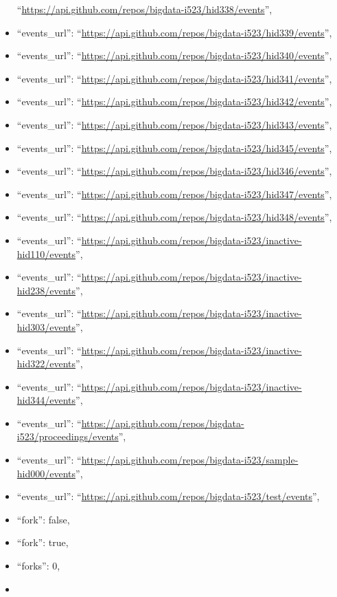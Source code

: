 \begin{itemize}
  ``\url{https://api.github.com/repos/bigdata-i523/hid338/events}'',
\item
  ``events\_url'':
  ``\url{https://api.github.com/repos/bigdata-i523/hid339/events}'',
\item
  ``events\_url'':
  ``\url{https://api.github.com/repos/bigdata-i523/hid340/events}'',
\item
  ``events\_url'':
  ``\url{https://api.github.com/repos/bigdata-i523/hid341/events}'',
\item
  ``events\_url'':
  ``\url{https://api.github.com/repos/bigdata-i523/hid342/events}'',
\item
  ``events\_url'':
  ``\url{https://api.github.com/repos/bigdata-i523/hid343/events}'',
\item
  ``events\_url'':
  ``\url{https://api.github.com/repos/bigdata-i523/hid345/events}'',
\item
  ``events\_url'':
  ``\url{https://api.github.com/repos/bigdata-i523/hid346/events}'',
\item
  ``events\_url'':
  ``\url{https://api.github.com/repos/bigdata-i523/hid347/events}'',
\item
  ``events\_url'':
  ``\url{https://api.github.com/repos/bigdata-i523/hid348/events}'',
\item
  ``events\_url'':
  ``\url{https://api.github.com/repos/bigdata-i523/inactive-hid110/events}'',
\item
  ``events\_url'':
  ``\url{https://api.github.com/repos/bigdata-i523/inactive-hid238/events}'',
\item
  ``events\_url'':
  ``\url{https://api.github.com/repos/bigdata-i523/inactive-hid303/events}'',
\item
  ``events\_url'':
  ``\url{https://api.github.com/repos/bigdata-i523/inactive-hid322/events}'',
\item
  ``events\_url'':
  ``\url{https://api.github.com/repos/bigdata-i523/inactive-hid344/events}'',
\item
  ``events\_url'':
  ``\url{https://api.github.com/repos/bigdata-i523/proceedings/events}'',
\item
  ``events\_url'':
  ``\url{https://api.github.com/repos/bigdata-i523/sample-hid000/events}'',
\item
  ``events\_url'':
  ``\url{https://api.github.com/repos/bigdata-i523/test/events}'',
\item
  ``fork'': false,
\item
  ``fork'': true,
\item
  ``forks'': 0,
\item

\end{itemize}
